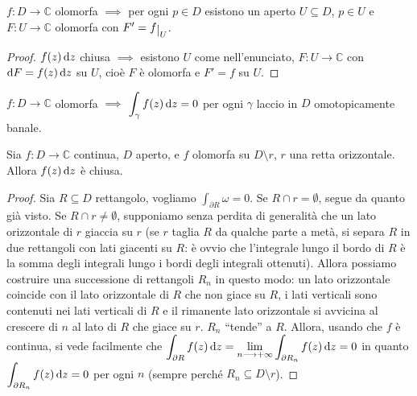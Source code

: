 \begin{cor}
  $f:D \longrightarrow \mathbb{C}$ olomorfa $\implies$ per ogni $p \in D$ esistono un aperto $U \subseteq D$, $p \in U$ e $F:U \longrightarrow \mathbb{C}$ olomorfa con $F'=f\restrict{U}$.
\end{cor}

\begin{proof}
  $f(z)\mathop{}\!\mathrm{d} z$ chiusa $\implies$ esistono $U$ come nell'enunciato, $F:U \longrightarrow \mathbb{C}$ con  $\mathop{}\!\mathrm{d} F=f(z)\mathop{}\!\mathrm{d} z$ su $U$, cioè $F$ è olomorfa e $F'=f$ su $U$.
\end{proof}

\begin{cor}
  $f:D \longrightarrow \mathbb{C}$ olomorfa $\implies$ $\displaystyle \int_{\gamma} f(z)\mathop{}\!\mathrm{d} z=0$ per ogni $\gamma$ laccio in $D$ omotopicamente banale.
\end{cor}

\begin{prop} \label{retta_orizzontale}
  Sia $f:D \longrightarrow \mathbb{C}$ continua, $D$ aperto, e $f$ olomorfa su $D \setminus r$, $r$ una retta orizzontale. Allora $f(z)\mathop{}\!\mathrm{d} z$ è chiusa.
\end{prop}

\begin{proof}
  Sia $R \subseteq D$ rettangolo, vogliamo $\displaystyle \int_{\partial R} \omega=0$. Se $R \cap r=\emptyset$, segue da quanto già visto. Se $R \cap r\not=\emptyset$, supponiamo senza perdita di generalità che un lato orizzontale di $r$ giaccia su $r$ (se $r$ taglia $R$ da qualche parte a metà, si separa $R$ in due rettangoli con lati giacenti su $R$: è ovvio che l'integrale lungo il bordo di $R$ è la somma degli integrali lungo i bordi degli integrali ottenuti). Allora possiamo costruire una successione di rettangoli $R_n$ in questo modo: un lato orizzontale coincide con il lato orizzontale di $R$ che non giace su $R$, i lati verticali sono contenuti nei lati verticali di $R$ e il rimanente lato orizzontale si avvicina al crescere di $n$ al lato di $R$ che giace su $r$.
  $R_n$ ``tende'' a $R$. Allora, usando che $f$ è continua, si vede facilmente che $\displaystyle \int_{\partial R} f(z)\mathop{}\!\mathrm{d} z=\lim_{n \longrightarrow +\infty} \int_{\partial R_n} f(z)\mathop{}\!\mathrm{d} z=0$ in quanto $\displaystyle \int_{\partial R_n} f(z)\mathop{}\!\mathrm{d} z=0$ per ogni $n$ (sempre perché $R_n \subseteq D \setminus r$).
\end{proof}

